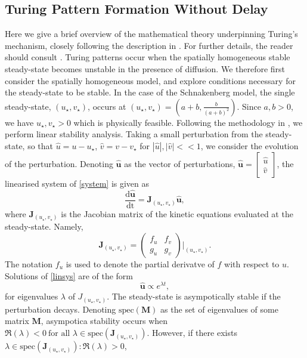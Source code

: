 \subsection{Turing Pattern Formation Without Delay}

Here we give a brief overview of the mathematical theory underpinning Turing's mechanism, closely following the description in \cite{murray}. For further details, the reader should consult \cite{murray,beentjes}. Turing patterns occur when the spatially homogeneous stable steady-state becomes unstable in the presence of diffusion. We therefore first consider the spatially homogeneous model, and explore conditions necessary for the steady-state to be stable. In the case of the Schnakenberg model, the single steady-state, $(u_\star, v_\star)$, occurs at $(u_\star, v_\star)=\left(a+b, \frac{b}{(a+b)^2}\right)$. Since $a,b>0$, we have $u_\star,v_\star>0$ which is physically feasible. Following the methodology in \cite{murray}, we perform linear stability analysis. Taking a small perturbation from the steady-state, so that $\hat{u}=u-u_\star$, $\hat{v}=v-v_\star$ for $|\hat{u}|, |\hat{v}|<<1$, we consider the evolution of the perturbation. Denoting $\hat{\textbf{u}}$ as the vector of perturbations, $\hat{\textbf{u}}=\begin{bmatrix}\hat{u} \\ \hat{v}\end{bmatrix}$, the linearised system of \eqref{system} is given as
\begin{equation}\label{linsys}
\frac{\text{d}\hat{\textbf{u}}}{\text{dt}}=\textbf{J}_{(u_\star,v_\star)}\hat{\textbf{u}},
\end{equation}
where $\textbf{J}_{(u_\star,v_\star)}$ is the Jacobian matrix of the kinetic equations evaluated at the steady-state. Namely,
$$
\textbf{J}_{(u_\star,v_\star)}=\begin{pmatrix}f_u&f_v\\g_u&g_v\end{pmatrix}\Bigg|_{(u_\star,v_\star)}.
$$
The notation $f_u$ is used to denote the partial derivatve of $f$ with respect to $u$. Solutions of \eqref{linsys} are of the form
$$
\hat{\textbf{u}}\propto e^{\lambda t},
$$
for eigenvalues $\lambda$ of $J_{(u_\star,v_\star)}$. The steady-state is asympotically stable if the perturbation decays.
Denoting $\text{spec}(\textbf{M})$ as the set of eigenvalues of some matrix $\textbf{M}$, asympotica stability occurs when $\Re(\lambda)<0 \ \text{for all }\lambda\in \text{spec}(\textbf{J}_{(u_\star,v_\star)})$. However, if there exists $\lambda\in \text{spec}(\textbf{J}_{(u_\star,v_\star)}): \Re(\lambda)>0$,
